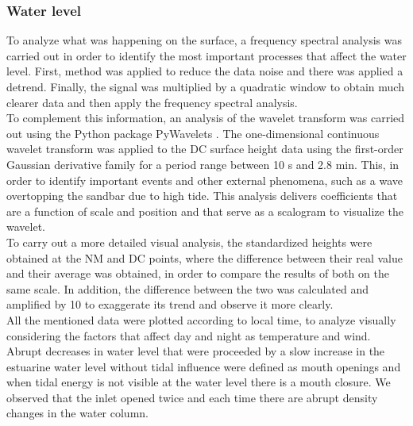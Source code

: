 \documentclass[tesis.tex]{subfiles}
\begin{document}
\subsubsection{Water level}

To analyze what was happening on the surface, a frequency spectral analysis was carried out in order to identify the most important processes that affect the water level. First, \cite{welch1967use} method was applied to reduce the data noise and there was applied a detrend. Finally, the signal was multiplied by a quadratic window to obtain much clearer data and then apply the frequency spectral analysis. \\

To complement this information, an analysis of the wavelet transform was carried out using the Python package PyWavelets \citep{lee2019pywavelets}. The one-dimensional continuous wavelet transform was applied to the DC surface height data using the first-order Gaussian derivative family for a period range between 10 s and 2.8 min. This, in order to identify important events and other external phenomena, such as a wave overtopping the sandbar due to high tide. This analysis delivers coefficients that are a function of scale and position and that serve as a scalogram to visualize the wavelet.\\

To carry out a more detailed visual analysis, the standardized heights were obtained at the NM and DC points, where the difference between their real value and their average was obtained, in order to compare the results of both on the same scale. In addition, the difference between the two was calculated and amplified by 10 to exaggerate its trend and observe it more clearly.\\

All the mentioned data were plotted according to local time, to analyze visually considering the factors that affect day and night as temperature and wind. Abrupt decreases in water level that were proceeded by a slow increase in the estuarine water level without tidal influence were defined as mouth openings and when tidal energy is not visible at the water level there is a mouth closure. We observed that the inlet opened twice and each time there are abrupt density changes in the water column.  
\end{document}
